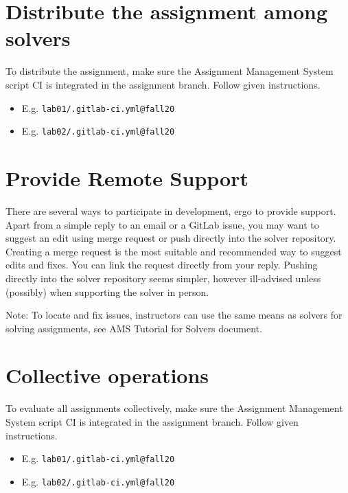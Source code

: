 \section{Distribute the assignment among solvers} \label{ssec:distributeassn}

{To distribute the assignment, make sure the Assignment Management System script CI is integrated in the assignment branch. Follow given instructions.}

\begin{itemize}
\item
  {E.g. \texttt{lab01/.gitlab-ci.yml@fall20}}
\item
  {E.g. \texttt{lab02/.gitlab-ci.yml@fall20}}
\end{itemize}

\section{Provide Remote Support} \label{ssec:providesup}

{There are several ways to participate in development, ergo to provide support. Apart from a simple reply to an email or a GitLab issue, you may want to suggest an edit using merge request or push directly into the solver repository.}
{Creating a merge request is the most suitable and recommended way to suggest edits and fixes. You can link the request directly from your reply. Pushing directly into the solver repository seems simpler, however ill-advised unless (possibly) when supporting the solver in person.}

{Note: To locate and fix issues, instructors can use the same means as solvers for solving assignments, see AMS Tutorial for Solvers document.}

\section{Collective operations} \label{ssec:collop}

{To evaluate all assignments collectively, make sure the Assignment Management System script CI is integrated in the assignment branch. Follow given instructions.}

\begin{itemize}
\item
  {E.g. \texttt{lab01/.gitlab-ci.yml@fall20}}
\item
  {E.g. \texttt{lab02/.gitlab-ci.yml@fall20}}
\end{itemize}

